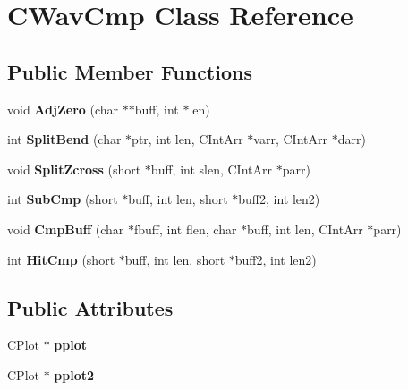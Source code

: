 \hypertarget{class_c_wav_cmp}{\section{C\-Wav\-Cmp Class Reference}
\label{class_c_wav_cmp}
}
\subsection*{Public Member Functions}
\begin{DoxyCompactItemize}
\item 
\hypertarget{class_c_wav_cmp_ad1831beaece137ceea7f96822e0b6837}{void {\bfseries Adj\-Zero} (char $\ast$$\ast$buff, int $\ast$len)}\label{class_c_wav_cmp_ad1831beaece137ceea7f96822e0b6837}

\item 
\hypertarget{class_c_wav_cmp_a9ff22d3d1dd9d028395038c073e13b39}{int {\bfseries Split\-Bend} (char $\ast$ptr, int len, C\-Int\-Arr $\ast$varr, C\-Int\-Arr $\ast$darr)}\label{class_c_wav_cmp_a9ff22d3d1dd9d028395038c073e13b39}

\item 
\hypertarget{class_c_wav_cmp_a7ac9315a5f24f5fa1ba8aaf8eb044dfa}{void {\bfseries Split\-Zcross} (short $\ast$buff, int slen, C\-Int\-Arr $\ast$parr)}\label{class_c_wav_cmp_a7ac9315a5f24f5fa1ba8aaf8eb044dfa}

\item 
\hypertarget{class_c_wav_cmp_adb4c118046da0fa262b58542aa269ec0}{int {\bfseries Sub\-Cmp} (short $\ast$buff, int len, short $\ast$buff2, int len2)}\label{class_c_wav_cmp_adb4c118046da0fa262b58542aa269ec0}

\item 
\hypertarget{class_c_wav_cmp_a54e744941438800981e5b3d8d96f2c04}{void {\bfseries Cmp\-Buff} (char $\ast$fbuff, int flen, char $\ast$buff, int len, C\-Int\-Arr $\ast$parr)}\label{class_c_wav_cmp_a54e744941438800981e5b3d8d96f2c04}

\item 
\hypertarget{class_c_wav_cmp_aa62e2ae6a5a7d48f0904f713300bcbd6}{int {\bfseries Hit\-Cmp} (short $\ast$buff, int len, short $\ast$buff2, int len2)}\label{class_c_wav_cmp_aa62e2ae6a5a7d48f0904f713300bcbd6}

\end{DoxyCompactItemize}
\subsection*{Public Attributes}
\begin{DoxyCompactItemize}
\item 
\hypertarget{class_c_wav_cmp_aa8a2677e94ad6cc111be638897b688ad}{C\-Plot $\ast$ {\bfseries pplot}}\label{class_c_wav_cmp_aa8a2677e94ad6cc111be638897b688ad}

\item 
\hypertarget{class_c_wav_cmp_a1cd461bdaa7ddf0ed45b8d837f748511}{C\-Plot $\ast$ {\bfseries pplot2}}\label{class_c_wav_cmp_a1cd461bdaa7ddf0ed45b8d837f748511}

\end{DoxyCompactItemize}
